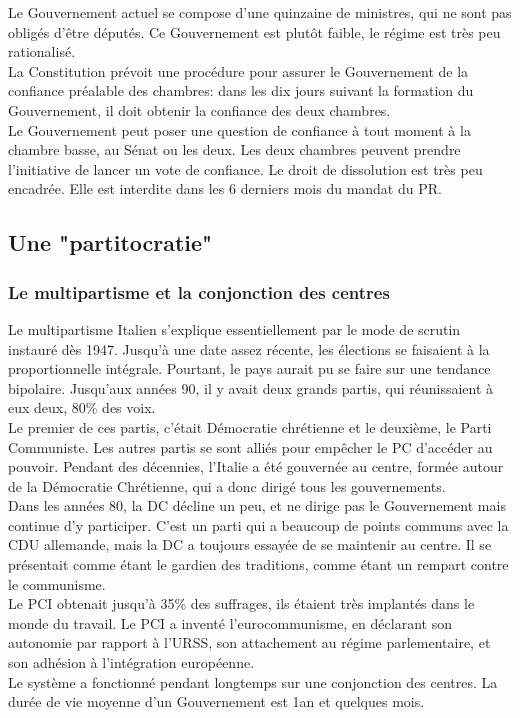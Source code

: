 \documentclass[10pt, a4paper, openany]{book}
\begin{document}
Le Gouvernement actuel se compose d'une quinzaine de ministres, qui ne sont pas obligés d'être députés. Ce Gouvernement est plutôt faible, le régime est très peu rationalisé. \\
La Constitution prévoit une procédure pour assurer le Gouvernement de la confiance préalable des chambres: dans les dix jours suivant la formation du Gouvernement, il doit obtenir la confiance des deux chambres. \\
Le Gouvernement peut poser une question de confiance à tout moment à la chambre basse, au Sénat ou les deux. Les deux chambres peuvent prendre l'initiative de lancer un vote de confiance. Le droit de dissolution est très peu encadrée. Elle est interdite dans les 6 derniers mois du mandat du PR. 

\subsection{Une "partitocratie"}

\subsubsection{Le multipartisme et la conjonction des centres}

Le multipartisme Italien s'explique essentiellement par le mode de scrutin instauré dès 1947. Jusqu'à une date assez récente, les élections se faisaient à la proportionnelle intégrale. Pourtant, le pays aurait pu se faire sur une tendance bipolaire. Jusqu'aux années 90, il y avait deux grands partis, qui réunissaient à eux deux, 80\% des voix. \\
Le premier de ces partis, c'était Démocratie chrétienne et le deuxième, le Parti Communiste. Les autres partis se sont alliés pour empêcher le PC d'accéder au pouvoir. Pendant des décennies, l'Italie a été gouvernée au centre, formée autour de la Démocratie Chrétienne, qui a donc dirigé tous les gouvernements. \\
Dans les années 80, la DC décline un peu, et ne dirige pas le Gouvernement mais continue d'y participer. C'est un parti qui a beaucoup de points communs avec la CDU allemande, mais la DC a toujours essayée de se maintenir au centre. Il se présentait comme étant le gardien des traditions, comme étant un rempart contre le communisme. \\
Le PCI obtenait jusqu'à 35\% des suffrages, ils étaient très implantés dans le monde du travail. Le PCI a inventé l'eurocommunisme, en déclarant son autonomie par rapport à l'URSS, son attachement au régime parlementaire, et son adhésion à l'intégration européenne. \\
Le système a fonctionné pendant longtemps sur une conjonction des centres. La durée de vie moyenne d'un Gouvernement est 1an et quelques mois. \\
\end{document}
